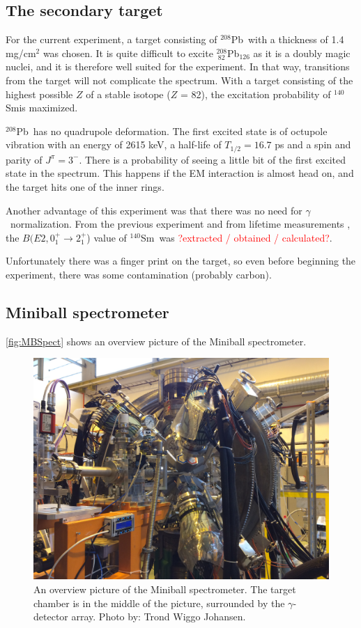 \documentclass[twoside,english]{uiofysmaster/uiofysmaster}
\newcommand{\Sm}{$^{140}$Sm} %
\newcommand{\Pb}{$^{208}$Pb}
\newcommand{\ga}{$\gamma$}
\let\orgautoref\autoref
\renewcommand{\autoref}
        {%
		 \def\subsectionautorefname{Section}%
		 \def\subsubsectionautorefname{Section}%
          \orgautoref}
\begin{document}
\subsection{The secondary target}
For the current experiment, a target consisting of \Pb\ with a thickness of 1.4 mg/cm$^2$ was chosen. 
It is quite difficult to excite $^{208}_{~82}$Pb$_{126}$ as it is a doubly magic nuclei, and it is therefore well suited for the experiment. 
In that way, transitions from the target will not complicate the spectrum.
With a target consisting of the highest possible $Z$ of a stable isotope ($Z$ = 82), the excitation probability of \Sm is maximized. 

\Pb\ has no quadrupole deformation.
The first excited state is of octupole vibration with an energy of 2615 keV, a half-life of $T_{1/2} = 16.7$ ps and a spin and parity of $J^\pi = 3^-$.
There is a probability of seeing a little bit of the first excited state in the spectrum. 
This happens if the EM interaction is almost head on, and the target hits one of the inner rings.

Another advantage of this experiment was that there was no need for \ga\ normalization. 
From the previous experiment \cite{Klintefjord2016} and from lifetime measurements \cite{BelloGarrote2015}, the $B(E2, 0_1^+ \rightarrow 2_1^+$) value of \Sm\ was \textcolor{red}{?extracted / obtained / calculated?}. 

Unfortunately there was a finger print on the target, so even before beginning the experiment, there was some contamination (probably carbon).


\subsection{Miniball spectrometer}
\autoref{fig:MBSpect} shows an overview picture of the Miniball spectrometer. 

\begin{figure}[ht]
	\centering
	\includegraphics[width=\linewidth]{Images/IMG3849.JPG}
	\caption{An overview picture of the Miniball spectrometer. The target chamber is in the middle of the picture, surrounded by the \ga-detector array. Photo by: Trond Wiggo Johansen.}
	\label{fig:MBSpect}
\end{figure}
\end{document}
